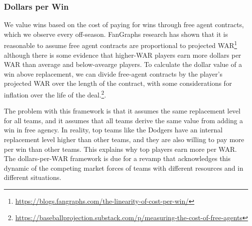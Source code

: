 \documentclass{article}
\begin{document}
      \begin{center}
      \end{center}

      \subsubsection{\sc Dollars per Win}

        We value wins based on the cost of paying for wins through free agent contracts, which we observe every off-season. FanGraphs research has shown that it is reasonable to assume free agent contracts are proportional to projected WAR\footnote{\url{https://blogs.fangraphs.com/the-linearity-of-cost-per-win/}} although there is some evidence that higher-WAR players earn more dollars per WAR than average and below-avearge players. To calculate the dollar value of a win above replacement, we can divide free-agent contracts by the player's projected WAR over the length of the contract, with some considerations for inflation over the life of the deal.\footnote{\url{https://baseballprojection.substack.com/p/measuring-the-cost-of-free-agents}}.

        \begin{framed}
          The problem with this framework is that it assumes the same replacement level for all teams, and it assumes that all teams derive the same value from adding a win in free agency. In reality, top teams like the Dodgers have an internal replacement level higher than other teams, and they are also willing to pay more per win than other teams. This explains why top players earn more per WAR. The dollars-per-WAR framework is due for a revamp that acknowledges this dynamic of the competing market forces of teams with different resources and in different situations.
        \end{framed}
\end{document}

